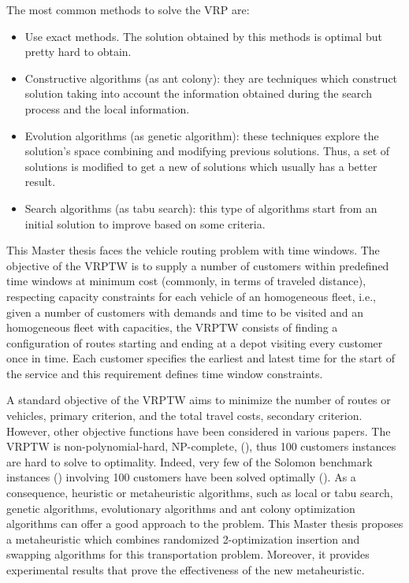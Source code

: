 The most common methods to solve the VRP are:

\begin{itemize}
	\item Use exact methods. The solution obtained by this methods is optimal but pretty hard to obtain.
	\item Constructive algorithms (as ant colony): they are techniques which construct solution taking into account the information obtained during the search process and the local information.
	\item Evolution algorithms (as genetic algorithm): these techniques explore the solution's space combining and modifying previous solutions. Thus, a set of solutions is modified to get a new of solutions which usually has a better result.
	\item Search algorithms (as tabu search): this type of algorithms start from an initial solution to improve based on some criteria. 
\end{itemize}


This Master thesis faces the vehicle routing problem with time windows. The objective of the VRPTW is to supply a number of customers within predefined time windows at minimum cost (commonly, in terms of traveled distance), respecting capacity constraints for each vehicle of an homogeneous fleet, i.e., given a number of customers with demands and time to be visited and an homogeneous fleet with capacities, the VRPTW consists of finding a configuration of routes starting and ending at a depot visiting every customer once in time. Each customer specifies the earliest and latest time for the start of the service and this requirement defines time window constraints.

A standard objective of the VRPTW aims to minimize the number of routes or vehicles, primary criterion, and the total travel costs, secondary criterion. However, other objective functions have been considered in various papers.
The VRPTW is non-polynomial-hard, NP-complete, (\cite{Lenstra}), thus 100 customers instances are hard to solve to optimality. Indeed, very few of the Solomon benchmark instances (\cite{Solomon_1987}) involving 100 customers have been solved optimally (\cite{Fisher}).
As a consequence, heuristic or metaheuristic algorithms, such as local or tabu search, genetic algorithms, evolutionary algorithms and ant colony optimization algorithms can offer a good approach to the problem. This Master thesis proposes a metaheuristic which combines randomized 2-optimization insertion and swapping algorithms for this transportation problem. Moreover, it provides experimental results that prove the effectiveness of the new metaheuristic.

